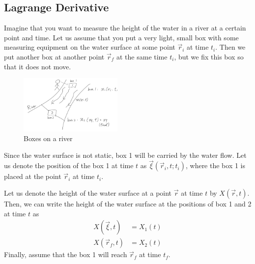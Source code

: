 \cite{eman-fluidEoM}

\subsection{Lagrange Derivative}
Imagine that you want to measure the height of the water in a river at a certain point and time.
Let us assume that you put a very light, small box with some measuring equipment on the water surface at some point $\vec{r}_i$ at time $t_i$.
Then we put another box at another point $\vec{r}_f$ at the same time $t_i$, but we fix this box so that it does not move.

\begin{figure}
  \centering
  \includegraphics[width=0.45\textwidth]{images/am/river.png}
  \caption{Boxes on a river}
  \label{fig:lagrange_derivative}
\end{figure}
Since the water surface is not static, box 1 will be carried by the water flow.
Let us denote the position of the box 1 at time $t$ as $\vec{\xi} (\vec{r}_i, t; t_i)$, where the box 1 is placed at the point $\vec{r}_i$ at time $t_i$.

Let us denote the height of the water surface at a point $\vec{r}$ at time $t$ by $X(\vec{r}, t)$.
Then, we can write the height of the water surface at the positions of box 1 and 2 at time $t$ as
\begin{align}
  X(\vec{\xi}, t) & = X_1(t) \\
  X(\vec{r}_f, t) & = X_2(t)
\end{align}
Finally, assume that the box 1 will reach $\vec{r}_f$ at time $t_f$.

